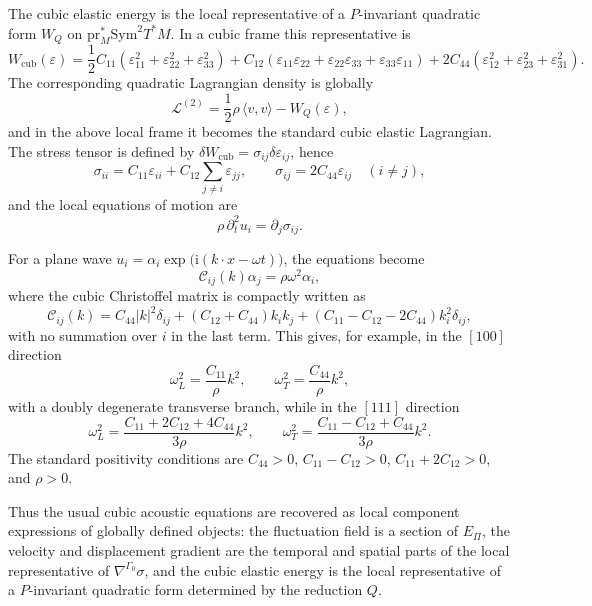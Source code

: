 \documentclass[11pt]{amsart}
\theoremstyle{plain}
\theoremstyle{definition}
\theoremstyle{remark}
\begin{document}
The cubic elastic energy is the local representative of a \(P\)-invariant quadratic form \(W_Q\) on \(\mathrm{pr}_M^*\mathrm{Sym}^2T^*M\). 
In a cubic frame this representative is
\[
W_{\mathrm{cub}}(\varepsilon)
=
\frac12 C_{11}(\varepsilon_{11}^2+\varepsilon_{22}^2+\varepsilon_{33}^2)
+
C_{12}(\varepsilon_{11}\varepsilon_{22}
+\varepsilon_{22}\varepsilon_{33}
+\varepsilon_{33}\varepsilon_{11})
+
2C_{44}(\varepsilon_{12}^2+\varepsilon_{23}^2+\varepsilon_{31}^2).
\]
The corresponding quadratic Lagrangian density is globally
\[
\mathcal L^{(2)}
=
\frac12\rho\,\langle v,v\rangle-W_Q(\varepsilon),
\]
and in the above local frame it becomes the standard cubic elastic Lagrangian. 
The stress tensor is defined by \(\delta W_{\mathrm{cub}}=\sigma_{ij}\delta\varepsilon_{ij}\), hence
\[
\sigma_{ii}=C_{11}\varepsilon_{ii}+C_{12}\sum_{j\neq i}\varepsilon_{jj},
\qquad
\sigma_{ij}=2C_{44}\varepsilon_{ij}\quad(i\neq j),
\]
and the local equations of motion are
\[
\rho\,\partial_t^2u_i=\partial_j\sigma_{ij}.
\]

For a plane wave \(u_i=\alpha_i\exp\!\bigl(\mathrm i(k\cdot x-\omega t)\bigr)\), the equations become
\[
\mathcal C_{ij}(k)\alpha_j=\rho\omega^2\alpha_i,
\]
where the cubic Christoffel matrix \cite{NyePhysicalProperties,MusgraveCrystalAcoustics} is compactly written as
\[
\mathcal C_{ij}(k)
=
C_{44}|k|^2\delta_{ij}
+
(C_{12}+C_{44})k_i k_j
+
(C_{11}-C_{12}-2C_{44})k_i^2\delta_{ij},
\]
with no summation over \(i\) in the last term. 
This gives, for example, in the \([100]\) direction
\[
\omega_L^2=\frac{C_{11}}{\rho}k^2,
\qquad
\omega_T^2=\frac{C_{44}}{\rho}k^2,
\]
with a doubly degenerate transverse branch, while in the \([111]\) direction
\[
\omega_L^2=\frac{C_{11}+2C_{12}+4C_{44}}{3\rho}k^2,
\qquad
\omega_T^2=\frac{C_{11}-C_{12}+C_{44}}{3\rho}k^2.
\]
The standard positivity conditions are \(C_{44}>0\), \(C_{11}-C_{12}>0\), \(C_{11}+2C_{12}>0\), and \(\rho>0\).

Thus the usual cubic acoustic equations are recovered as local component expressions of globally defined objects: the fluctuation field is a section of \(E_\Pi\), the velocity and displacement gradient are the temporal and spatial parts of the local representative of \(\nabla^{\Gamma_0}\sigma\), and the cubic elastic energy is the local representative of a \(P\)-invariant quadratic form determined by the reduction \(Q\).




\end{document}
